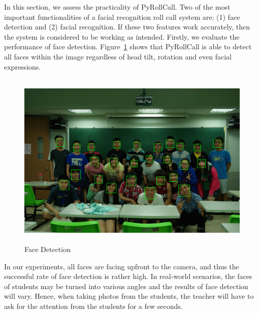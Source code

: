 In this section, we assess the practicality of PyRollCall. Two of the most important
functionalities of a facial recognition roll call system are: (1) face detection
and (2) facial recognition. If these two features work accurately, then the system
is considered to be working as intended. Firstly, we evaluate the performance of face detection.
Figure~\ref{fig:face-detection-test} shows that PyRollCall is able to detect all faces
within the image regardless of head tilt, rotation and even facial expressions.
\vspace{0.2cm}

\begin{figure}[!htb]
  \centering
  \includegraphics[height=8.5cm]{figures/face-detection-test.png}
  \caption{Face Detection}
  \label{fig:face-detection-test}
\end{figure}

In our experiments, all faces are facing upfront to the camera, and thus the successful
rate of face detection is rather high. In real-world scenarios, the faces of students
may be turned into various angles and the results of face detection will vary. Hence,
when taking photos from the students, the teacher will have to ask for the attention from
the students for a few seconds.

